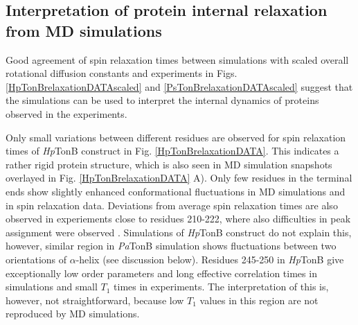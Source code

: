 \documentclass[pre,aps,floatfix,authordate1-4,twocolumn]{revtex4-1}
\begin{document}



\subsection{Interpretation of protein internal relaxation from MD simulations}
Good agreement of spin relaxation times between simulations
with scaled overall rotational diffusion constants and
experiments in Figs. \ref{HpTonBrelaxationDATAscaled} and \ref{PsTonBrelaxationDATAscaled}
suggest that the simulations can be used to interpret the internal
dynamics of proteins observed in the experiments.

Only small variations between different residues are observed
for spin relaxation times of {\it Hp}TonB construct in Fig. \ref{HpTonBrelaxationDATA}.
This indicates a rather rigid protein structure, which is also seen in
MD simulation snapshots overlayed in Fig. \ref{HpTonBrelaxationDATA} A).
Only few residues in the terminal ends show slightly
enhanced conformational fluctuations in MD simulations and in
spin relaxation data. Deviations from average spin relaxation times
are also observed in experiements close to residues 210-222, where also 
difficulties in peak assignment were observed \cite{ciragan16}.
Simulations of {\it Hp}TonB construct do not explain this,
however, similar region in {\it Pa}TonB simulation shows 
fluctuations between two orientations of $\alpha$-helix (see discussion below).
Residues 245-250 in {\it Hp}TonB give exceptionally low order parameters
and long effective correlation times in simulations and small $T_1$ times
in experiments. The interpretation of this is, however, not straightforward,
because low $T_1$ values in this region are not reproduced by MD simulations.
\end{document}
